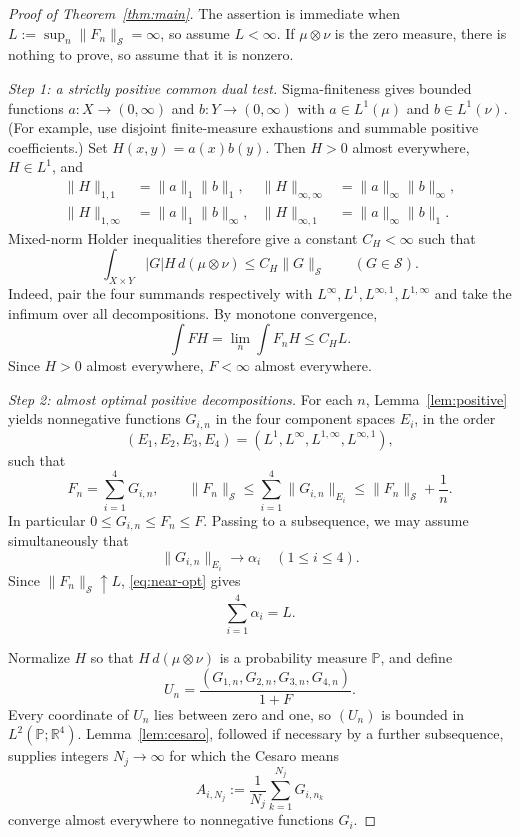 \documentclass[11pt]{article}
\newcommand{\Sspace}{\mathcal S}
\begin{document}
\begin{proof}[Proof of Theorem~\ref{thm:main}]
The assertion is immediate when
$L:=\sup_n\|F_n\|_{\Sspace}=\infty$, so assume $L<\infty$.
If $\mu\otimes\nu$ is the zero measure, there is nothing to prove, so assume
that it is nonzero.

\smallskip
\noindent\emph{Step 1: a strictly positive common dual test.}
Sigma-finiteness gives bounded functions
$a:X\to(0,\infty)$ and $b:Y\to(0,\infty)$ with
$a\in L^1(\mu)$ and $b\in L^1(\nu)$.  (For example, use disjoint
finite-measure exhaustions and summable positive coefficients.)  Set
$H(x,y)=a(x)b(y)$.  Then $H>0$ almost everywhere, $H\in L^1$, and
\begin{align*}
 \|H\|_{1,1}&=\|a\|_1\|b\|_1,&
 \|H\|_{\infty,\infty}&=\|a\|_\infty\|b\|_\infty,\\
 \|H\|_{1,\infty}&=\|a\|_1\|b\|_\infty,&
 \|H\|_{\infty,1}&=\|a\|_\infty\|b\|_1.
\end{align*}
Mixed-norm Holder inequalities therefore give a constant $C_H<\infty$ such
that
\begin{equation}\label{eq:dual-test}
 \int_{X\times Y}|G|H\,d(\mu\otimes\nu)
 \leq C_H\|G\|_{\Sspace}
 \qquad(G\in\Sspace).
\end{equation}
Indeed, pair the four summands respectively with
$L^\infty,L^1,L^{\infty,1},L^{1,\infty}$ and take the infimum over all
decompositions.  By monotone convergence,
\[
 \int FH=\lim_n\int F_nH\leq C_HL.
\]
Since $H>0$ almost everywhere, $F<\infty$ almost everywhere.

\smallskip
\noindent\emph{Step 2: almost optimal positive decompositions.}
For each $n$, Lemma~\ref{lem:positive} yields nonnegative functions
$G_{i,n}$ in the four component spaces $E_i$, in the order
\[
 (E_1,E_2,E_3,E_4)
 =(L^1,L^\infty,L^{1,\infty},L^{\infty,1}),
\]
such that
\begin{equation}\label{eq:near-opt}
 F_n=\sum_{i=1}^4G_{i,n},
 \qquad
 \|F_n\|_{\Sspace}
 \leq\sum_{i=1}^4\|G_{i,n}\|_{E_i}
 \leq\|F_n\|_{\Sspace}+\frac1n.
\end{equation}
In particular $0\leq G_{i,n}\leq F_n\leq F$.  Passing to a subsequence, we
may assume simultaneously that
\[
 \|G_{i,n}\|_{E_i}\longrightarrow\alpha_i
 \quad(1\leq i\leq4).
\]
Since $\|F_n\|_{\Sspace}\uparrow L$, \eqref{eq:near-opt} gives
\begin{equation}\label{eq:budget}
 \sum_{i=1}^4\alpha_i=L.
\end{equation}

Normalize $H$ so that $H\,d(\mu\otimes\nu)$ is a probability measure
$\mathbb P$, and define
\[
 U_n=\frac{(G_{1,n},G_{2,n},G_{3,n},G_{4,n})}{1+F}.
\]
Every coordinate of $U_n$ lies between zero and one, so $(U_n)$ is bounded
in $L^2(\mathbb P;\mathbb R^4)$.  Lemma~\ref{lem:cesaro}, followed if
necessary by a further subsequence, supplies integers $N_j\to\infty$ for
which the Cesaro means
\[
 A_{i,N_j}:=\frac1{N_j}\sum_{k=1}^{N_j}G_{i,n_k}
\]
converge almost everywhere to nonnegative functions $G_i$.


\end{proof}
\end{document}
